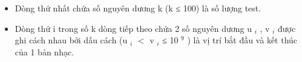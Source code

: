 \begin{itemize}
	\item Dòng thứ nhất chứa số nguyên dương k (k ≤ 100) là số lượng test.
	\item Dòng thứ i trong số k dòng tiếp theo chứa 2 số nguyên dương u $_ i $ , v $_ i $ được ghi cách nhau bởi dấu cách (u $_ i $ $<$ v $_ i $ ≤ 10 $^ 9 $ ) là vị trí bắt đầu và kết thúc của 1 bản nhạc.
\end{itemize}